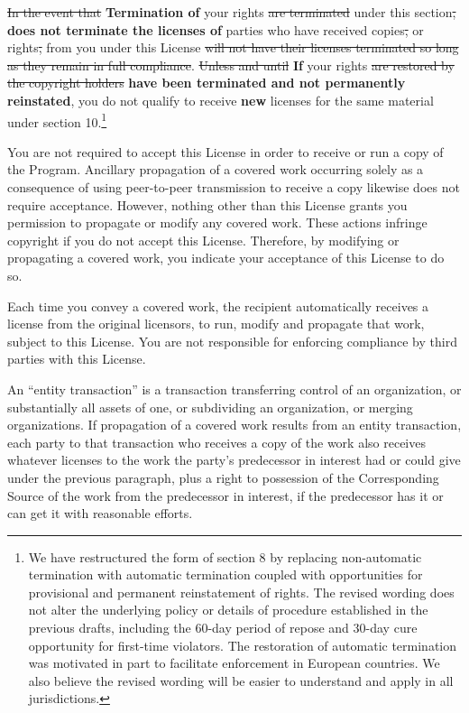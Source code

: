 \documentclass[11pt]{article}
\newcounter{v2section}
\newcounter{v3section}
\begin{document}
   \sout{In the event that} \textbf{Termination of} your rights
 \sout{are terminated} under this section\sout{,} \textbf{does not
 terminate the licenses of} parties who have received copies\sout{,} or
 rights\sout{,} from you under this License \sout{will not have their
 licenses terminated so long as they remain in full compliance}.
 \sout{Unless and until} \textbf{If} your rights \sout{are restored by
 the copyright holders} \textbf{have been terminated and not permanently
 reinstated}, you do not qualify to receive \textbf{new} licenses for
 the same material under section 10.\footnote{We have restructured the
 form of section 8 by replacing non-automatic termination with automatic
 termination coupled with opportunities for provisional and permanent
 reinstatement of rights.  The revised wording does not alter the
 underlying policy or details of procedure established in the previous
 drafts, including the 60-day period of repose and 30-day cure
 opportunity for first-time violators.  The restoration of automatic
 termination was motivated in part to facilitate enforcement in European
 countries.  We also believe the revised wording will be easier to
 understand and apply in all jurisdictions.}


  You are not required to accept this License in order to receive or run
a copy of the Program.  Ancillary propagation of a covered work
occurring solely as a consequence of using peer-to-peer transmission to
receive a copy likewise does not require acceptance.  However, nothing
other than this License grants you permission to propagate or modify any
covered work.  These actions infringe copyright if you do not accept
this License.  Therefore, by modifying or propagating a covered work,
you indicate your acceptance of this License to do so.


  Each time you convey a covered work, the recipient automatically
receives a license from the original licensors, to run, modify and
propagate that work, subject to this License.  You are not responsible
for enforcing compliance by third parties with this License.

  An ``entity transaction'' is a transaction transferring control of an
organization, or substantially all assets of one, or subdividing an
organization, or merging organizations.  If propagation of a covered
work results from an entity transaction, each party to that transaction
who receives a copy of the work also receives whatever licenses to the
work the party's predecessor in interest had or could give under the
previous paragraph, plus a right to possession of the Corresponding
Source of the work from the predecessor in interest, if the predecessor
has it or can get it with reasonable efforts.
\end{document}
